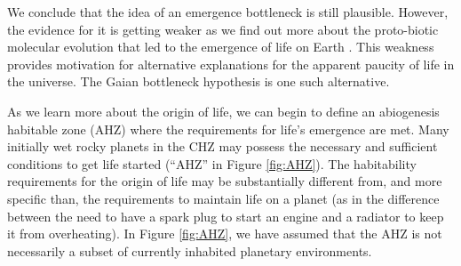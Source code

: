 We conclude that the idea of an emergence bottleneck is still plausible. 
However, the evidence for it is getting weaker as we find out more about the proto-biotic molecular evolution that led to the emergence of life on Earth
\citep[\eg,][]{Benner2013,England2013,Nisbet2014,Sousa2014}.
This weakness provides motivation for alternative explanations for the apparent paucity of life in the universe.
The Gaian bottleneck hypothesis is one such alternative.

As we learn more about the origin of life, we can begin to define an abiogenesis habitable zone (AHZ) where the requirements for life's emergence are met. 
Many initially wet rocky planets in the CHZ may possess the necessary and sufficient conditions to get life started  (``AHZ'' in Figure \ref{fig:AHZ}). The habitability requirements for the origin of life may be substantially different from, and more specific than, the requirements to maintain life on a planet  (as in the difference between the need to have a spark plug to start an engine and a radiator to keep it from overheating). In Figure \ref{fig:AHZ}, we have assumed that the AHZ is not necessarily a subset of currently inhabited planetary environments.
